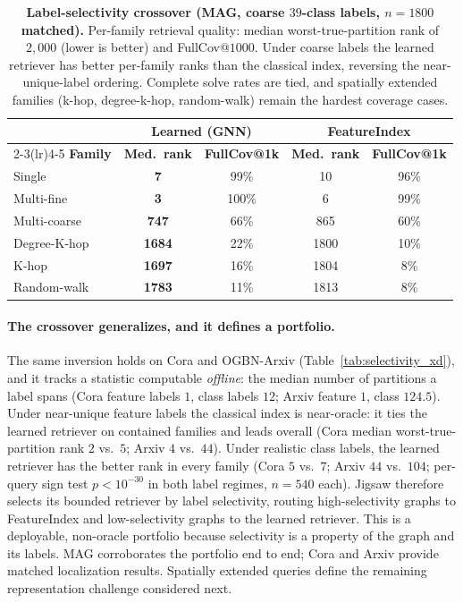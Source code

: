 \documentclass[runningheads]{llncs}
\begin{document}
\begin{table}[H]
\centering
\caption{\textbf{Label-selectivity crossover (MAG, coarse $39$-class labels, $n{=}1800$ matched).} Per-family retrieval quality: median worst-true-partition rank of $2{,}000$ (lower is better) and FullCov@$1000$. Under coarse labels the learned retriever has better per-family ranks than the classical index, reversing the near-unique-label ordering. Complete solve rates are tied, and spatially extended families (k-hop, degree-k-hop, random-walk) remain the hardest coverage cases.}
\label{tab:selectivity}
\small
\setlength{\tabcolsep}{6pt}
\begin{tabular}{lcccc}
\toprule
 & \multicolumn{2}{c}{\textbf{Learned (GNN)}} & \multicolumn{2}{c}{\textbf{FeatureIndex}} \\
\cmidrule(lr){2-3}\cmidrule(lr){4-5}
\textbf{Family} & \textbf{Med.\ rank} & \textbf{FullCov@1k} & \textbf{Med.\ rank} & \textbf{FullCov@1k} \\
\midrule
Single        & \textbf{7}    & 99\%  & 10   & 96\% \\
Multi-fine    & \textbf{3}    & 100\% & 6    & 99\% \\
Multi-coarse  & \textbf{747}  & 66\%  & 865  & 60\% \\
Degree-K-hop  & \textbf{1684} & 22\%  & 1800 & 10\% \\
K-hop         & \textbf{1697} & 16\%  & 1804 & 8\% \\
Random-walk   & \textbf{1783} & 11\%  & 1813 & 8\% \\
\bottomrule
\end{tabular}
\end{table}

\paragraph{The crossover generalizes, and it defines a portfolio.} The same inversion holds on Cora and OGBN-Arxiv (Table~\ref{tab:selectivity_xd}), and it tracks a statistic computable \emph{offline}: the median number of partitions a label spans (Cora feature labels $1$, class labels $12$; Arxiv feature $1$, class $124.5$). Under near-unique feature labels the classical index is near-oracle: it ties the learned retriever on contained families and leads overall (Cora median worst-true-partition rank $2$ vs.\ $5$; Arxiv $4$ vs.\ $44$). Under realistic class labels, the learned retriever has the better rank in every family (Cora $5$ vs.\ $7$; Arxiv $44$ vs.\ $104$; per-query sign test $p<10^{-30}$ in both label regimes, $n{=}540$ each). Jigsaw therefore selects its bounded retriever by label selectivity, routing high-selectivity graphs to FeatureIndex and low-selectivity graphs to the learned retriever. This is a deployable, non-oracle portfolio because selectivity is a property of the graph and its labels. MAG corroborates the portfolio end to end; Cora and Arxiv provide matched localization results. Spatially extended queries define the remaining representation challenge considered next.
\end{document}
